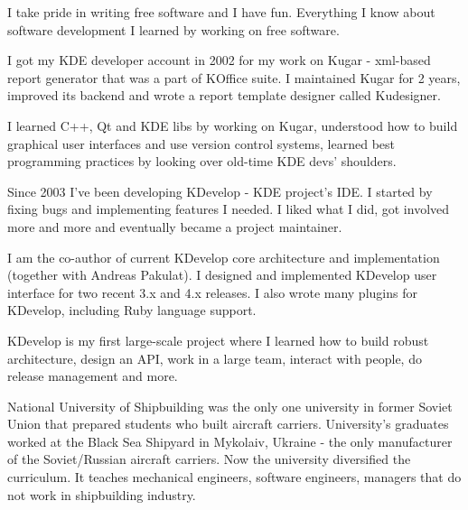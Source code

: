 \documentclass[12pt]{letter}
\begin{document}
\begin{llist}
            \item I take pride in writing free software and I have fun. Everything I know about software development I learned by working on free software.

            \item I got my KDE developer account in 2002 for my work on Kugar - xml-based report generator that was a part of KOffice suite. I maintained Kugar for 2 years, improved its backend and wrote a report template designer called Kudesigner.

            \item I learned C++, Qt and KDE libs by working on Kugar, understood how to build graphical user interfaces and use   version control systems, learned best programming practices by looking over old-time KDE devs' shoulders.

            \item Since 2003 I've been developing KDevelop - KDE project's IDE. I started by fixing bugs and implementing features I needed. I liked what I did, got involved more and more and eventually became a project maintainer.

            \item I am the co-author of current KDevelop core architecture and implementation (together with Andreas Pakulat). I designed and implemented KDevelop user interface for two recent 3.x and 4.x releases. I also wrote many plugins for KDevelop, including Ruby language support.

            \item KDevelop is my first large-scale project where I learned how to build robust architecture, design an API, work in a large team, interact with people, do release management and more.

  \endexperience






  \startexperience

            \item National University of Shipbuilding was the only one university in former Soviet Union that prepared students who built aircraft carriers. University's graduates worked at the Black Sea Shipyard in Mykolaiv, Ukraine - the only manufacturer of the Soviet/Russian aircraft carriers. Now the university diversified the curriculum. It teaches mechanical engineers, software engineers, managers that do not work in shipbuilding industry.


\end{llist}
\end{document}

